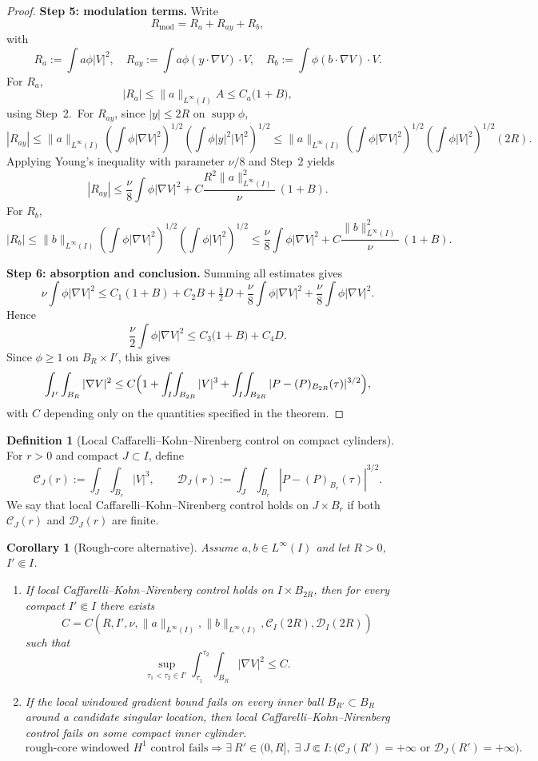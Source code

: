 \documentclass[11pt]{amsart}
\theoremstyle{plain}
\newtheorem{corollary}[theorem]{Corollary}
\theoremstyle{definition}
\newtheorem{definition}[theorem]{Definition}
\begin{document}
\begin{proof}
\textbf{Step 5: modulation terms.}
Write
\[
R_{\mathrm{mod}}=R_a+R_{ay}+R_b,
\]
with
\[
R_a:=\int a\phi|V|^2,
\quad
R_{ay}:=\int a\phi(y\cdot\nabla V)\cdot V,
\quad
R_b:=\int \phi(b\cdot\nabla V)\cdot V.
\]
For $R_a$,
\[
|R_a|\le \|a\|_{L^\infty(I)}A
\le C_a\bigl(1+B\bigr),
\]
using Step~2.\
For $R_{ay}$, since $|y|\le2R$ on $\operatorname{supp}\phi$,
\[
|R_{ay}|\le\|a\|_{L^\infty(I)}
\left(\int \phi|\nabla V|^2\right)^{1/2}
\left(\int \phi|y|^2|V|^2\right)^{1/2}
\le\|a\|_{L^\infty(I)}
\left(\int \phi|\nabla V|^2\right)^{1/2}
\left(\int\phi|V|^2\right)^{1/2}(2R).
\]
Applying Young's inequality with parameter $\nu/8$ and Step~2 yields
\[
|R_{ay}|
\le \frac{\nu}{8}\int\phi|\nabla V|^2+
C\frac{R^2\|a\|_{L^\infty(I)}^2}{\nu}\,(1+B).
\]
For $R_b$,
\[
|R_b|\le\|b\|_{L^\infty(I)}
\left(\int\phi|\nabla V|^2\right)^{1/2}
\left(\int\phi|V|^2\right)^{1/2}
\le \frac{\nu}{8}\int\phi|\nabla V|^2+
C\frac{\|b\|_{L^\infty(I)}^2}{\nu}\,(1+B).
\]

\textbf{Step 6: absorption and conclusion.}
Summing all estimates gives
\[
\nu\int\phi|\nabla V|^2
\le C_1(1+B)+C_2B+\tfrac12D+
\frac{\nu}{8}\int\phi|\nabla V|^2+\frac{\nu}{8}\int\phi|\nabla V|^2.
\]
Hence
\[
\frac\nu2\int\phi|\nabla V|^2
\le C_3\bigl(1+B\bigr)+C_4D.
\]
Since $\phi\ge1$ on $B_R\times I'$, this gives
\[
\int_{I'}\int_{B_R}|\nabla V|^2
\le C\Bigl(1+
\int_I\!\int_{B_{2R}}|V|^3+
\int_I\!\int_{B_{2R}}|P-(P)_{B_{2R}}(\tau)|^{3/2}
\Bigr),
\]
with $C$ depending only on the quantities specified in the theorem.
\end{proof}

\begin{definition}[Local Caffarelli--Kohn--Nirenberg control on compact cylinders]
For $r>0$ and compact $J\subset I$, define
\[
\mathcal C_J(r):=\int_J\!\int_{B_r}|V|^3,
\qquad
\mathcal D_J(r):=\int_J\!\int_{B_r}|P-(P)_{B_r}(\tau)|^{3/2}.
\]
We say that local Caffarelli--Kohn--Nirenberg control holds on $J\times B_r$ if both
$\mathcal C_J(r)$ and $\mathcal D_J(r)$ are finite.
\end{definition}

\begin{corollary}[Rough-core alternative]
\label{cor:rough-core}
Assume $a,b\in L^\infty(I)$ and let $R>0$, $I'\Subset I$.
\begin{enumerate}[label=\textup{(\roman*)}]
\item If local Caffarelli--Kohn--Nirenberg control holds on $I\times B_{2R}$,
then for every compact $I'\Subset I$ there exists
\[
C=C(R,I',\nu,\|a\|_{L^\infty(I)},\|b\|_{L^\infty(I)},\mathcal C_I(2R),\mathcal D_I(2R))
\]
such that
\[
\sup_{\tau_1<\tau_2\in I'}\int_{\tau_1}^{\tau_2}\int_{B_R}|\nabla V|^2
\le C.
\]
\item If the local windowed gradient bound fails on every inner ball $B_{R'}\subset B_R$
around a candidate singular location, then local Caffarelli--Kohn--Nirenberg control fails on
some compact inner cylinder.
\[
\text{rough-core windowed }H^1\text{ control fails}
\Longrightarrow
\exists\ R'\in(0,R],\;\exists\ J\Subset I:
\bigl(\mathcal C_J(R')=+\infty\text{ or }\mathcal D_J(R')=+\infty\bigr).
\]
\end{enumerate}
\end{corollary}
\end{document}

